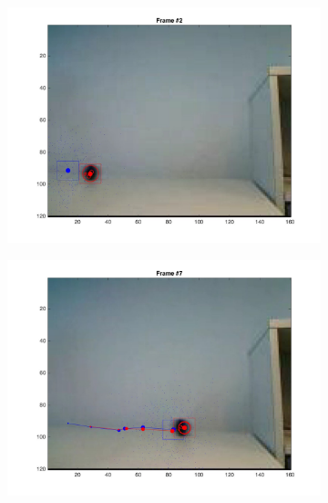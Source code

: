 \documentclass{ethz_report}
\begin{document}
\begin{figure}[h]
    \centering
    \begin{subfigure}[b]{.25\textwidth}
        \centering
        \includegraphics[width=1\linewidth]{images/video3_particles_high_1}
    \end{subfigure}%
    \begin{subfigure}[b]{.25\textwidth}
        \centering
        \includegraphics[width=1\linewidth]{images/video3_particles_high_6}
    \end{subfigure}%
    \begin{subfigure}[b]{.25\textwidth}
        \centering

\end{subfigure}
\end{figure}
\end{document}

